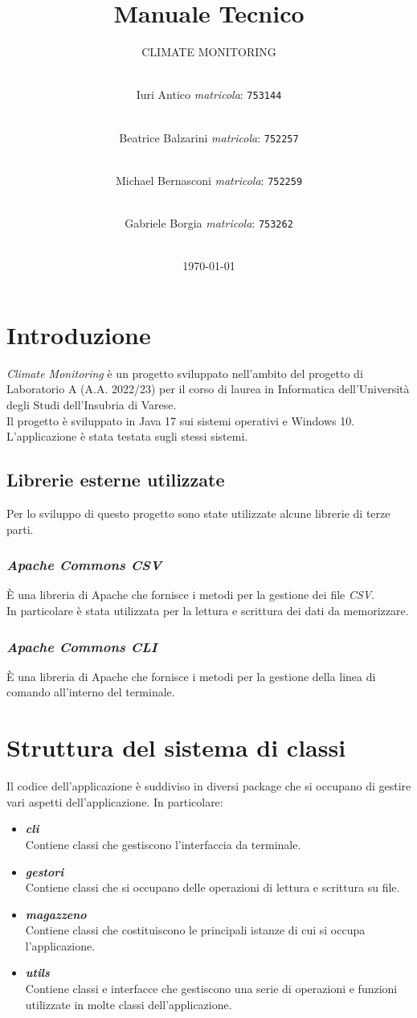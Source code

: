 \documentclass[a4paper, 12pt]{scrreprt}
\title {Manuale Tecnico}
\subtitle{CLIMATE MONITORING}
\author{
	\\Iuri Antico \textsl{matricola}:
	\texttt{753144}
	\and \\
	Beatrice Balzarini \textsl{matricola}:
	\texttt{752257}
	\and \\
	Michael Bernasconi \textsl{matricola}:
	\texttt{752259}
	\and \\
	Gabriele Borgia \textsl{matricola}:
	\texttt{753262}\\\\
	}
\date{\today}
\begin{document}
	\maketitle
	\tableofcontents

	\chapter{Introduzione}
	\textsl{Climate Monitoring} \`e un progetto sviluppato nell’ambito del progetto di Laboratorio A (A.A. 2022/23) per il 
	corso di laurea in Informatica dell’Universit\`a degli Studi dell’Insubria di Varese.\\
	Il progetto \`e sviluppato in Java 17 sui sistemi operativi    e Windows 10. L'applicazione \`e stata testata sugli stessi sistemi.
		\section{Librerie esterne utilizzate}
		Per lo sviluppo di questo progetto sono state utilizzate alcune librerie di terze parti.
			\subsection{\textsl{Apache Commons CSV}}
			\`E una libreria di Apache che fornisce i metodi per la gestione dei file \textsl{CSV}. \\In particolare \`e stata utilizzata per la lettura e scrittura dei dati da memorizzare.
			\subsection{\textsl{Apache Commons CLI}}
			\`E una libreria di Apache che fornisce i metodi per la gestione della linea di comando all'interno del terminale.

	\chapter{Struttura del sistema di classi}
	Il codice dell'applicazione \`e suddiviso in diversi package che si occupano di gestire vari aspetti dell'applicazione. In particolare:
	\begin{itemize}
		\item \textbf{\textsl{cli}}\\Contiene classi che gestiscono l'interfaccia da terminale.
		\item \textbf{\textsl{gestori}}\\Contiene classi che si occupano delle operazioni di lettura e scrittura su file.
		\item \textbf{\textsl{magazzeno}}\\Contiene classi che costituiscono le principali istanze di cui si occupa l'applicazione.
		\item \textbf{\textsl{utils}}\\Contiene classi e interfacce che gestiscono una serie di operazioni e funzioni utilizzate in molte classi dell'applicazione.
	\end{itemize}
	
\end{document}
